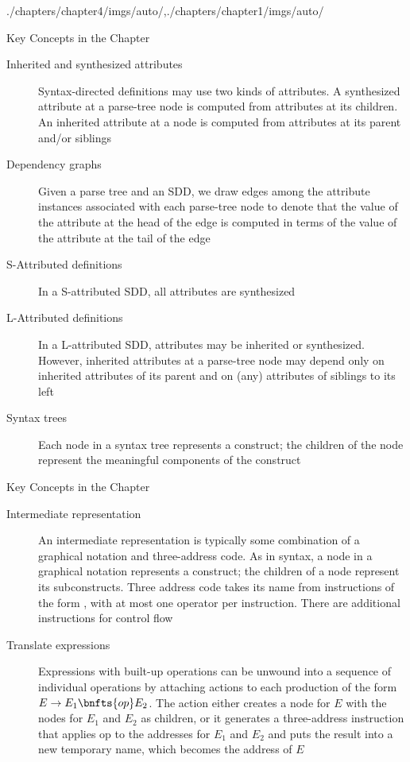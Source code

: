 \begin{graphicspathcontext}{{./chapters/chapter4/imgs/auto/},{./chapters/chapter1/imgs/auto/}}
\begin{bibunit}[apalike]
\begin{frame}{{Key Concepts} in the Chapter}
	\begin{description}
	\item[Inherited and synthesized attributes] Syntax-directed definitions may use two kinds of attributes. A synthesized attribute at a parse-tree node is computed from attributes at its children. An inherited attribute at a node is computed from attributes at its parent and/or siblings
	\item[Dependency graphs] Given a parse tree and an SDD, we draw edges among the attribute instances associated with each parse-tree node to denote that the value of the attribute at the head of the edge is computed in terms of the value of the attribute at the tail of the edge
	\item[S-Attributed definitions] In a S-attributed SDD, all attributes are synthesized
	\item[L-Attributed definitions] In a L-attributed SDD, attributes may be inherited or synthesized. However, inherited attributes at a parse-tree node may depend only on inherited attributes of its parent and on (any) attributes of siblings to its left
	\item[Syntax trees] Each node in a syntax tree represents a construct; the children of the node represent the meaningful components of the construct
	\end{description}
\end{frame}

\begin{frame}{{Key Concepts} in the Chapter \insertcontinuationtext}
	\begin{description}
	\item[Intermediate representation] An intermediate representation is typically some combination of a graphical notation and three-address code. As in syntax, a node in a graphical notation represents a construct; the children of a node represent its subconstructs. Three address code takes its name from instructions of the form , with at most one operator per instruction. There are additional instructions for control flow
	\item[Translate expressions] Expressions with built-up operations can be unwound into a sequence of individual operations by attaching actions to each production of the form $E \bnfopo E_1 \bnfts{op} E_2$. The action either creates a node for $E$ with the nodes for $E_1$ and $E_2$ as children, or it generates a three-address instruction that applies op to the addresses for $E_1$ and $E_2$ and puts the result into a new temporary name, which becomes the address of $E$
	\end{description}
\end{frame}


\end{bibunit}
\end{graphicspathcontext}
